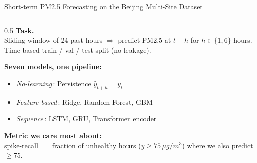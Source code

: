 \documentclass[10pt,aspectratio=169]{beamer}
\begin{document}
\begin{frame}{Short-term PM2.5 Forecasting on the Beijing Multi-Site Dataset}
\begin{columns}[T,onlytextwidth]
\begin{column}{0.5\linewidth}
\vspace{0.6em}
\textbf{Task.}\\
Sliding window of \alert{24 past hours}
$\Rightarrow$ predict PM2.5 at $t{+}h$ for $h \in \{1, 6\}$ hours.\\
Time-based train / val / test split (no leakage).

\vspace{0.6em}
\textbf{Seven models, one pipeline:}
\begin{itemize}\setlength\itemsep{0.15em}
  \item \textit{No-learning}\,: Persistence $\hat y_{t+h}{=}y_t$
  \item \textit{Feature-based}\,: Ridge, Random Forest, GBM
  \item \textit{Sequence}\,: LSTM, GRU, Transformer encoder
\end{itemize}

\vspace{0.6em}
\textbf{Metric we care most about:}\\
\alert{spike-recall} $=$ fraction of unhealthy hours
($y \geq 75\,\mu g/m^3$) where we also predict $\geq 75$.
\end{column}
\end{columns}
\end{frame}
\end{document}
